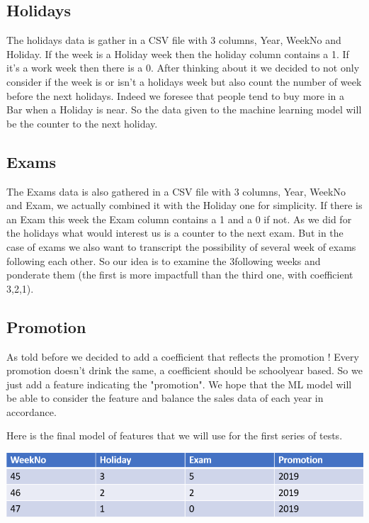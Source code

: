 \documentclass{report}
\begin{document}
\subsection{Holidays}

The holidays data is gather in a CSV file with 3 columns, Year, WeekNo and Holiday. If the week is a Holiday week then the holiday column contains a 1. If it's a work week then there is a 0. After thinking about it we decided to not only consider if the week is or isn't a holidays week but also count the number of week before the next holidays. Indeed we foresee that people tend to buy more in a Bar when a Holiday is near.
So the data given to the machine learning model will be the counter to the next holiday.

\subsection{Exams}

The Exams data is also gathered in a CSV file with 3 columns, Year, WeekNo and Exam, we actually combined it with the Holiday one for simplicity. If there is an Exam this week the Exam column contains a 1 and a 0 if not. As we did for the holidays what would interest us is a counter to the next exam. But in the case of exams we also want to transcript the possibility of several week of exams following each other. So our idea is to examine the 3following weeks and ponderate them (the first is more impactfull than the third one, with coefficient 3,2,1). 

\subsection{Promotion}

As told before we decided to add a coefficient that reflects the promotion ! Every promotion doesn't drink the same, a coefficient should be schoolyear based. So we just add a feature indicating the "promotion". We hope that the ML model will be able to consider the feature and balance the sales data of each year in accordance.

\vspace{5mm} 

Here is the final model of features that we will use for the first series of tests.

\includegraphics[scale=0.7]{DataModel}
\end{document}
